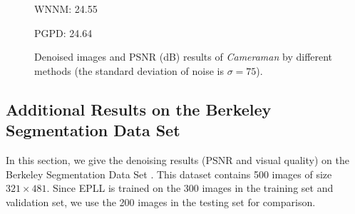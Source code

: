 \begin{figure}[ht!]
{\begin{minipage}[t]{0.24\textwidth}
{\footnotesize WNNM: 24.55}
\end{minipage}
\begin{minipage}[t]{0.24\textwidth}
\centering
{}
{\footnotesize PGPD: 24.64}
\end{minipage}
}\vspace{-3mm}
    \caption{Denoised images and PSNR (dB) results of \textsl{Cameraman} by different methods (the standard deviation of noise is $\sigma=75$).}
    \label{fig2-13}
\end{figure}

\subsection{Additional Results on the Berkeley Segmentation Data Set}
In this section, we give the denoising results (PSNR and visual quality) on the Berkeley Segmentation Data Set \cite{bsds}. This dataset contains 500 images of size $321\times481$. Since EPLL is trained on the 300 images in the training set and validation set, we use the 200 images in the testing set for comparison. 

